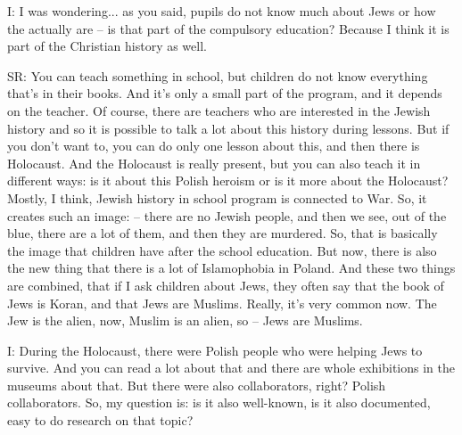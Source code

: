  

I: I was wondering... as you said, pupils do not know much about Jews or how the actually are – is that part of the compulsory education? Because I think it is part of the Christian history as well. 

 

SR: You can teach something in school, but children do not know everything that’s in their books. And it’s only a small part of the program, and it depends on the teacher. Of course, there are teachers who are interested in the Jewish history and so it is possible to talk a lot about this history during lessons. But if you don’t want to, you can do only one lesson about this, and then there is Holocaust. And the Holocaust is really present, but you can also teach it in different ways: is it about this Polish heroism or is it more about the Holocaust? Mostly, I think, Jewish history in school program is connected to War. So, it creates such an image: – there are no Jewish people, and then we see, out of the blue, there are a lot of them, and then they are murdered. So, that is basically the image that children have after the school education. But now, there is also the new thing that there is a lot of Islamophobia in Poland. And these two things are combined, that if I ask children about Jews, they often say that the book of Jews is Koran, and that Jews are Muslims. Really, it’s very common now. The Jew is the alien, now, Muslim is an alien, so – Jews are Muslims.  

 

I: During the Holocaust, there were Polish people who were helping Jews to survive. And you can read a lot about that and there are whole exhibitions in the museums about that. But there were also collaborators, right? Polish collaborators. So, my question is: is it also well-known, is it also documented, easy to do research on that topic? 

 

